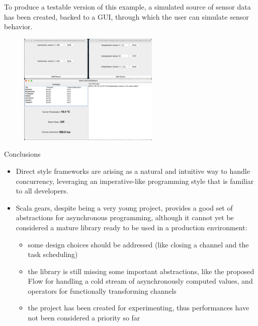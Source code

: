 \documentclass[aspectratio=1610,xcolor=dvipsnames,handout]{beamer}
\begin{document}
\begin{frame}
  \small
  To produce a testable version of this example, a simulated source of sensor data has been created, backed to a GUI, through which the user can simulate sensor behavior.
  \begin{figure}
      \centering
      \includegraphics[width=0.6\textwidth]{./images/smart-hub.png}
  \end{figure}
\end{frame}
%
\begin{frame}{Conclusions}
  \begin{itemize}
      \item Direct style frameworks are arising as a natural and intuitive way to handle concurrency, leveraging an imperative-like programming style that is familiar to all developers.
      \item Scala gears, despite being a very young project, provides a good set of abstractions for asynchronous programming, although it cannot yet be considered a mature library ready to be used in a production environment:
      \begin{itemize}
          \item some design choices should be addressed (like closing a channel and the task scheduling)
          \item the library is still missing some important abstractions, like the proposed Flow for handling a cold stream of asynchronously computed values, and operators for functionally transforming channels
          \item  the project has been created for experimenting, thus performances have not been considered a priority so far
      \end{itemize}
  \end{itemize}
\end{frame}
%
\end{document}
